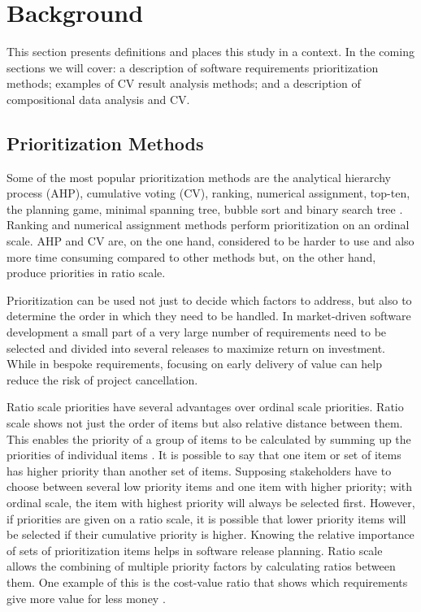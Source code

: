 \section{Background\label{background}}

This section presents definitions and places this study in a context. In the coming sections we will cover: a description of software requirements prioritization methods; examples of CV result analysis methods; and a description of compositional data analysis and CV.

\subsection{Prioritization Methods}

Some of the most popular prioritization methods are the analytical hierarchy
process (AHP), cumulative voting (CV), ranking, numerical assignment,
top-ten, the planning game, minimal spanning tree, bubble sort and binary
search tree \cite{Berander2005,Karlsson1998}. Ranking and numerical
assignment methods perform prioritization on an ordinal scale. AHP and CV
are, on the one hand, considered to be harder to use and also more time 
consuming compared to other methods but, on the other hand, produce 
priorities in ratio scale.

Prioritization can be used not just to decide which factors to address,
but also to determine the order in which they need to be handled. In market-driven 
software development a small part of a very large number of requirements
need to be selected and divided into several releases to maximize return
on investment. While in bespoke requirements, focusing on early delivery
of value can help reduce the risk of project cancellation.

Ratio scale priorities have several advantages over ordinal scale
priorities. Ratio scale shows not just the order of items but also
relative distance between them. This enables the priority of a group of
items to be calculated by summing up the priorities of individual items
\cite{Berander2006a}. It is possible to say that one item or set
of items has higher priority than another set of items. Supposing stakeholders
have to choose between several low priority items and one item with
higher priority; with ordinal scale, the item with highest priority will
always be selected first. However, if priorities are given on a ratio
scale, it is possible that lower priority items will be selected if
their cumulative priority is higher. Knowing the relative importance of
sets of prioritization items helps in software release planning. Ratio
scale allows the combining of multiple priority factors by calculating ratios
between them. One example of this is the cost-value ratio that shows which
requirements give more value for less money \cite{Karlsson1997}.

